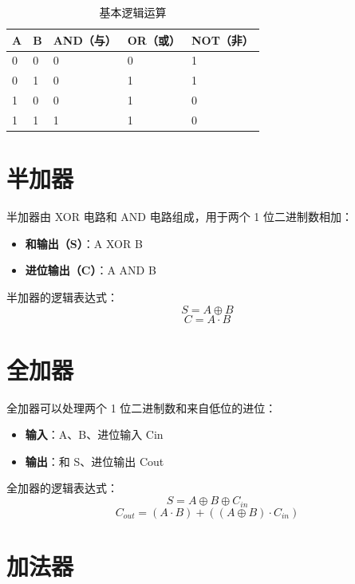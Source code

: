 \documentclass[12pt,UTF8]{ctexbook}
\begin{document}
\begin{table}[htbp]
    \centering
    \caption{基本逻辑运算}
    \begin{tabular}{|p{2cm}|p{2cm}|p{2cm}|p{2cm}|p{2cm}|}
        \hline
        \textbf{A} & \textbf{B} & \textbf{AND（与）} & \textbf{OR（或）} & \textbf{NOT（非）} \\
        \hline
        0 & 0 & 0 & 0 & 1 \\
        \hline
        0 & 1 & 0 & 1 & 1 \\
        \hline
        1 & 0 & 0 & 1 & 0 \\
        \hline
        1 & 1 & 1 & 1 & 0 \\
        \hline
    \end{tabular}
\end{table}

\section{半加器}

半加器由 XOR 电路和 AND 电路组成，用于两个 1 位二进制数相加：

\begin{itemize}[leftmargin=2cm]
    \item \textbf{和输出（S）}：A XOR B
    \item \textbf{进位输出（C）}：A AND B
\end{itemize}

半加器的逻辑表达式：
\[
S = A \oplus B
\]
\[
C = A \cdot B
\]

\section{全加器}

全加器可以处理两个 1 位二进制数和来自低位的进位：

\begin{itemize}[leftmargin=2cm]
    \item \textbf{输入}：A、B、进位输入 Cin
    \item \textbf{输出}：和 S、进位输出 Cout
\end{itemize}

全加器的逻辑表达式：
\[
S = A \oplus B \oplus C_{in}
\]
\[
C_{out} = (A \cdot B) + ((A \oplus B) \cdot C_{in})
\]

\section{加法器}
\end{document}
